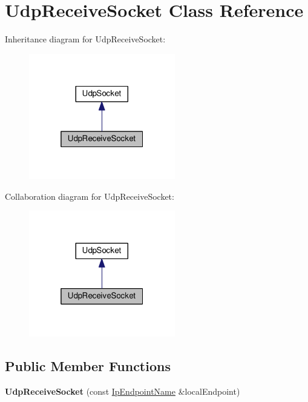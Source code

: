 \hypertarget{class_udp_receive_socket}{}\section{Udp\+Receive\+Socket Class Reference}
\label{class_udp_receive_socket}


Inheritance diagram for Udp\+Receive\+Socket\+:\nopagebreak
\begin{figure}[H]
\begin{center}
\leavevmode
\includegraphics[width=181pt]{class_udp_receive_socket__inherit__graph}
\end{center}
\end{figure}


Collaboration diagram for Udp\+Receive\+Socket\+:\nopagebreak
\begin{figure}[H]
\begin{center}
\leavevmode
\includegraphics[width=181pt]{class_udp_receive_socket__coll__graph}
\end{center}
\end{figure}
\subsection*{Public Member Functions}
\begin{DoxyCompactItemize}
\item 
\mbox{\label{class_udp_receive_socket_a3d54302725f3203beed2c65ab9a238ea}} 
{\bfseries Udp\+Receive\+Socket} (const \hyperlink{class_ip_endpoint_name}{Ip\+Endpoint\+Name} \&local\+Endpoint)
\end{DoxyCompactItemize}


